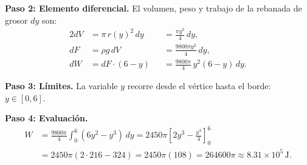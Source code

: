 \begin{example}
\begin{myproof}
\textbf{Paso 2: Elemento diferencial.}
El volumen, peso y trabajo de la rebanada de grosor $dy$ son:
\begin{alignat*}{2}
  dV &= \pi\,r(y)^2\,dy &&= \frac{\pi y^2}{4}\,dy, \\[4pt]
  dF &= \rho g\,dV       &&= \frac{9800\pi y^2}{4}\,dy, \\[4pt]
  dW &= dF\cdot(6-y)     &&= \frac{9800\pi}{4}\,y^2(6-y)\,dy.
\end{alignat*}

\textbf{Paso 3: Límites.}
La variable $y$ recorre desde el vértice hasta el borde: $y\in[0,6]$.

\textbf{Paso 4: Evaluación.}
\begin{align*}
  W &= \frac{9800\pi}{4}\int_0^6(6y^2-y^3)\,dy
     = 2450\pi\left[2y^3-\frac{y^4}{4}\right]_0^6 \\
    &= 2450\pi\!\left(2\cdot216 - 324\right)
     = 2450\pi(108)
     = \boxed{264600\pi\approx 8.31\times10^5\,\text{J}}.
\end{align*}
\end{myproof}
\end{example}



